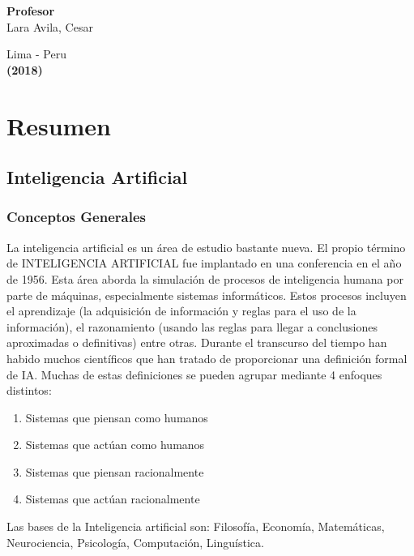\documentclass[a4paper]{article}
\begin{document}
\begin{titlepage}
\begin{center}
\vspace*{0.4in}
\begin{large}
{\bf Profesor} 
\vspace*{0.1in}
\\Lara Avila, Cesar
\end{large}

\end{center}
\begin{center}
\begin{large}
\vspace*{1.0in}
Lima - Peru\\
{\bf (2018)}
\end{large}
\end{center}
\end{titlepage}

\pagebreak
\tableofcontents
\pagebreak

\section{Resumen}
\subsection{Inteligencia Artificial}
\subsubsection{Conceptos Generales}
La inteligencia artificial es un área de estudio bastante nueva. El propio término de INTELIGENCIA ARTIFICIAL fue implantado en una conferencia en el año de 1956. Esta área aborda la simulación de procesos de inteligencia humana por parte de máquinas, especialmente sistemas informáticos. Estos procesos incluyen el aprendizaje (la adquisición de información y reglas para el uso de la información), el razonamiento (usando las reglas para llegar a conclusiones aproximadas o definitivas) entre otras.
Durante el transcurso del tiempo han habido muchos científicos que han tratado de proporcionar una definición formal de IA. Muchas de estas definiciones se pueden agrupar mediante 4 enfoques distintos:

\begin{enumerate}
\item Sistemas que piensan como humanos
\item Sistemas que actúan como humanos
\item Sistemas que piensan racionalmente
\item Sistemas que actúan racionalmente
\end{enumerate}
Las bases de la Inteligencia artificial son: Filosofía, Economía, Matemáticas, Neurociencia, Psicología, Computación, Linguística.
\end{document}
